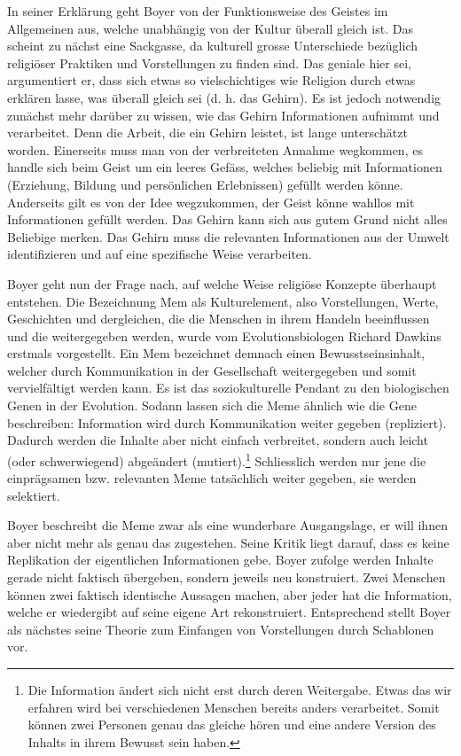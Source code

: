 In seiner Erklärung geht Boyer von der Funktionsweise des Geistes im Allgemeinen aus, welche unabhängig von der Kultur überall gleich ist. Das scheint zu nächst eine Sackgasse, da kulturell grosse Unterschiede bezüglich religiöser Praktiken und Vorstellungen zu finden sind. Das geniale hier sei, argumentiert er, dass sich etwas so vielschichtiges wie Religion durch etwas erklären lasse, was überall gleich sei (d. h. das Gehirn). Es ist jedoch notwendig zunächst mehr darüber zu wissen, wie das Gehirn Informationen aufnimmt und verarbeitet.\todo{[S.11]} Denn die Arbeit, die ein Gehirn leistet, ist lange unterschätzt worden. Einerseits muss man von der verbreiteten Annahme wegkommen, es handle sich beim Geist um ein leeres Gefäss, welches beliebig mit Informationen (Erziehung, Bildung und persönlichen Erlebnissen) gefüllt werden könne. Anderseits gilt es von der Idee wegzukommen, der Geist könne wahllos mit Informationen gefüllt werden. Das Gehirn kann sich aus gutem Grund nicht alles Beliebige merken. Das Gehirn muss die relevanten Informationen aus der Umwelt identifizieren und auf eine spezifische Weise verarbeiten.\todo{[S. 12]} 

Boyer geht nun der Frage nach, auf welche Weise religiöse Konzepte überhaupt entstehen. Die Bezeichnung Mem als Kulturelement, also Vorstellungen, Werte, Geschichten und dergleichen, die die Menschen in ihrem Handeln beeinflussen und die weitergegeben werden, wurde vom Evolutionsbiologen Richard Dawkins erstmals vorgestellt. Ein Mem bezeichnet demnach einen Bewusstseinsinhalt, welcher durch Kommunikation in der Gesellschaft weitergegeben und somit vervielfältigt werden kann. Es ist das soziokulturelle Pendant zu den biologischen Genen in der Evolution. Sodann lassen sich die Meme ähnlich wie die Gene beschreiben: Information wird durch Kommunikation weiter gegeben (repliziert). Dadurch werden die Inhalte aber nicht einfach verbreitet, sondern auch leicht (oder schwerwiegend) abgeändert (mutiert).\footnote{Die Information ändert sich nicht erst durch deren Weitergabe. Etwas das wir erfahren wird bei verschiedenen Menschen bereits anders verarbeitet. Somit können zwei Personen genau das gleiche hören und eine andere Version des Inhalts in ihrem Bewusst sein haben.} Schliesslich werden nur jene die einprägsamen bzw. relevanten Meme tatsächlich weiter gegeben, sie werden selektiert.

Boyer beschreibt die Meme zwar als eine wunderbare Ausgangslage, er will ihnen aber nicht mehr als genau das zugestehen. Seine Kritik liegt darauf, dass es keine Replikation der eigentlichen Informationen gebe. Boyer zufolge werden Inhalte gerade nicht faktisch übergeben, sondern jeweils neu konstruiert. Zwei Menschen können zwei faktisch identische Aussagen machen, aber jeder hat die Information, welche er wiedergibt auf seine eigene Art rekonstruiert. Entsprechend stellt Boyer als nächstes seine Theorie zum Einfangen von Vorstellungen durch Schablonen vor.

